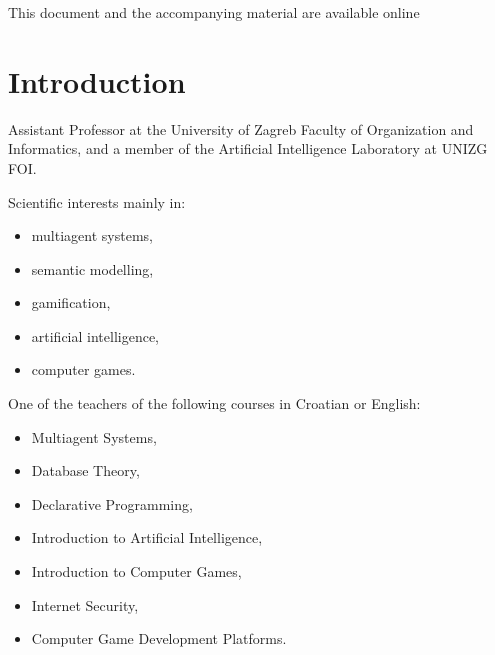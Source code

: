 
\begin{frame}
    \begin{multicols}{2}
        \centering
        
        \begin{minipage}[b]{0.42\linewidth}
            This document and the accompanying material are available online\hfill\href{https://github.com/AILab-FOI/MAGO/tree/main/Documents/241119\%20DSC\%20Europe}{\faExternalLink}
        \end{minipage}

        \columnbreak

    \end{multicols}
\end{frame}

\section{Introduction}

\begin{frame}{\insertsection}
    \begin{multicols}{2}
        Assistant Professor at the University of Zagreb \alert{Faculty of Organization and Informatics}, and a member of the Artificial Intelligence Laboratory at UNIZG FOI.

        \columnbreak
        
        Scientific interests mainly in:
        \begin{itemize}
            \item multiagent systems,
            \item semantic modelling,
            \item gamification,
            \item artificial intelligence,
            \item computer games.
        \end{itemize}
    \end{multicols}
\end{frame}

\begin{frame}{\insertsection}
    One of the teachers of the following courses in Croatian or English:
    \begin{multicols}{2}
        \begin{itemize}
            \item Multiagent Systems,
            \item Database Theory,
            \item Declarative Programming,
            \item Introduction to Artificial Intelligence,
            \item Introduction to Computer Games,
            \item Internet Security,
            \item Computer Game Development Platforms.
        \end{itemize}
    \end{multicols}
\end{frame}

